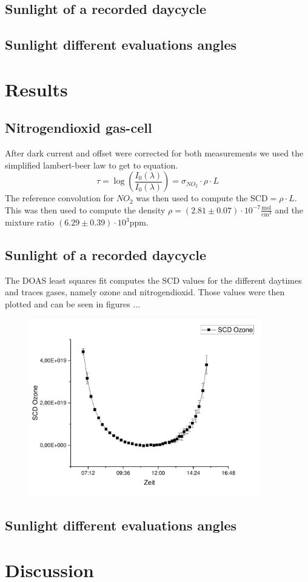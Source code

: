 \documentclass[12pt, english]{scrartcl} %
\begin{document}
\begin{multicols}{2}
\subsection{Sunlight of a recorded daycycle}

\subsection{Sunlight different evaluations angles}

\section{Results}
\subsection{Nitrogendioxid gas-cell}
After dark current and offset were corrected for both measurements we used the simplified lambert-beer law to get to equation.
\begin{equation}
\tau = \log(\frac{I_0(\lambda)}{I_0(\lambda)})= \sigma_{NO_2} \cdot \rho \cdot L
\end{equation}
The reference convolution for $NO_2$ was then used to compute the SCD$= \rho \cdot L$. This was then used to compute the density $\rho = (2.81 \pm 0.07 ) \cdot 10^{-7} \frac{\text{mol}}{\text{cm}^3}$ and the mixture ratio $(6.29 \pm 0.39) \cdot 10^3 \text{ppm}$.


\subsection{Sunlight of a recorded daycycle}
The DOAS least squares fit computes the SCD values for the different daytimes and traces gases, namely ozone and nitrogendioxid. Those values were then plotted and can be seen in figures ...
\begin{figure}
\includegraphics[width= 0.9\textwidth]{graphics/o3scd.pdf}
\end{figure}

\subsection{Sunlight different evaluations angles}


\section{Discussion}
\end{multicols}
\end{document}
